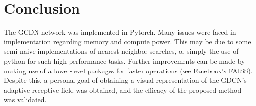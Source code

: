 \documentclass[12pt,a4paper,reqno]{amsart}
\begin{document}
\section{Conclusion}
The GCDN network \cite{ValsesiaICIP19} was implemented in Pytorch. Many issues
were faced in implementation regarding memory and compute power. This may be due
to some semi-naive implementations of nearest neighbor searches, or simply the
use of python for such high-performance tasks. Further improvements can be made
by making use of a lower-level packages for faster operations (see Facebook's
FAISS). Despite this, a personal goal of obtaining a visual representation of
the GDCN's adaptive receptive field was obtained, and the efficacy of the
proposed method was validated.

\printbibliography
\end{document}
